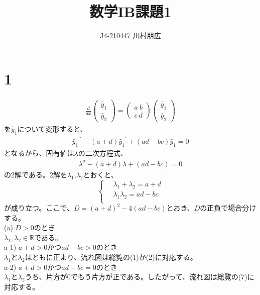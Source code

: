 \documentclass[pdflatex,ja=standard,fleqn]{bxjsarticle}
\title{数学IB課題1}
\author{J4-210447 川村朋広}
\begin{document}
\maketitle

\section*{1}
\begin{eqnarray*}
    \frac{d}{dx}\begin{pmatrix}
        \tilde{y_{1}} \\ \tilde{y_{2}}
    \end{pmatrix} = \begin{pmatrix}
        a \ b \\ c \ d
    \end{pmatrix}\begin{pmatrix}
        \tilde{y_{1}} \\ \tilde{y_{2}}
    \end{pmatrix}
\end{eqnarray*}
を$\tilde{y_{1}}$について変形すると、
\begin{eqnarray*}
    \tilde{y_{1}}^{\prime\prime}-(a+d)\tilde{y_{1}}^{\prime}+(ad-bc)\tilde{y_{1}} = 0
\end{eqnarray*}
となるから、固有値は$\lambda$の二次方程式、
\begin{eqnarray*}
    \lambda^{2}-(a+d)\lambda+(ad-bc)=0
\end{eqnarray*}
の2解である。2解を$\lambda_{1}$,$\lambda_{2}$とおくと、
\begin{equation}
    \left\{\,
        \begin{aligned}
            & \lambda_{1}+\lambda_{2}=a+d \\
            & \lambda_{1}\lambda_{2}=ad-bc \\
        \end{aligned}
    \right.
\end{equation}
が成り立つ。ここで、$D=(a+d)^{2}-4(ad-bc)$とおき、$D$の正負で場合分けする。\\
(a) $D>0$のとき \\
\quad$\lambda_{1}, \lambda_{2} \in \mathbb{R}$である。\\
\quad a-1) $a+d>0$かつ$ad-bc>0$のとき\\
\quad\quad$\lambda_{1}$と$\lambda_{2}$はともに正より、流れ図は総覧の(1)か(2)に対応する。\\
\quad a-2) $a+d>0$かつ$ad-bc=0$のとき\\
\quad\quad $\lambda_{1}$と$\lambda_{2}$うち、片方が$0$でもう片方が正である。したがって、流れ図は総覧の(7)に対応する。\\
\end{document}
